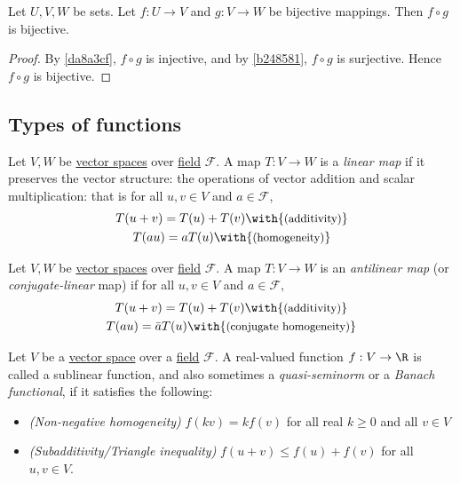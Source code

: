 Let $U,V,W$ be sets. Let $f:U\to V$ and $g:V\to W$ be bijective mappings. Then
$f\circ g$ is bijective.

\begin{proof}
  By \autoref{da8a3cf}, $f\circ g$ is injective, and by
  \autoref{b248581}, $f\circ g$ is surjective. Hence $f\circ g$ is
  bijective.
\end{proof}

\subsection{Types of functions}\label{d7f9764}

\label{d7d1925}

Let $V,W$ be \href{fc83050}{vector spaces} over \href{aec6040}{field} $\mathcal
F$. A map $T:V\to W$ is a \textit{linear map} if it preserves the vector
structure: the operations of vector addition and scalar multiplication: that is
for all $u,v\in V$ and $a\in\mathcal F$,
\begin{gather*}
  T(u+v)=T(u)+T(v)\with{\text{\small(additivity)}} \\
  T(au)=aT(u)\with{\text{\small(homogeneity)}}
\end{gather*}

\label{a93c786}

Let $V,W$ be \href{fc83050}{vector spaces} over \href{aec6040}{field} $\mathcal
F$. A map $T:V\to W$ is an \textit{antilinear map} (or
\textit{conjugate-linear} map) if for all $u,v\in V$ and $a\in\mathcal F$,
\begin{gather*}
  T(u+v)=T(u)+T(v)\with{\text{\small(additivity)}} \\
  T(au)=\bar aT(u)\with{\text{\small(conjugate homogeneity)}}
\end{gather*}

\label{af3e040}

Let $V$ be a \href{fc83050}{vector space} over a \href{aec6040}{field}
$\mathcal F$. A real-valued function $f:V\to\R$ is called a sublinear function,
and also sometimes a \textit{quasi-seminorm} or a \textit{Banach functional},
if it satisfies the following:
\begin{itemize}
  \item\textit{(Non-negative homogeneity)} $f(kv)=kf(v)$ for all real $k\geq0$
        and all $v\in V$
  \item\textit{(Subadditivity/Triangle inequality)} $f(u+v)\leq f(u)+f(v)$
        for all $u,v\in V$.
\end{itemize}

